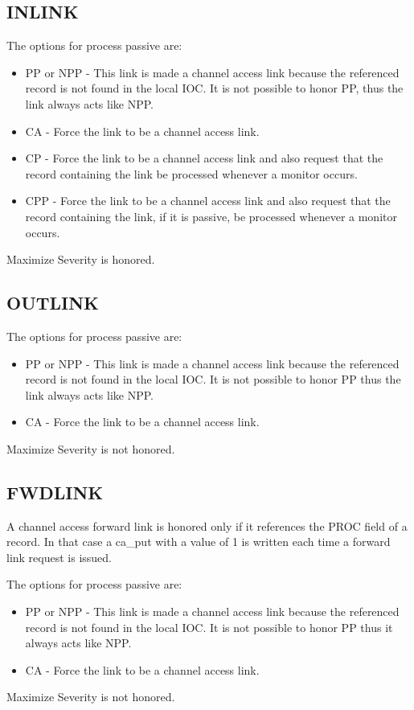 \subsection{INLINK}

The options for process passive are:

\begin{itemize}\item PP or NPP - This link is made a channel access link because the referenced record is not found in the local IOC. It 
is not possible to honor PP, thus the link always acts like NPP.

\item CA - Force the link to be a channel access link.

\item CP - Force the link to be a channel access link and also request that the record containing the link be processed 
whenever a monitor occurs.

\item CPP - Force the link to be a channel access link and also request that the record containing the link, if it is passive, 
be processed whenever a monitor occurs.

\end{itemize}Maximize Severity is honored.

\subsection{OUTLINK}

The options for process passive are:

\begin{itemize}\item PP or NPP - This link is made a channel access link because the referenced record is not found in the local IOC. It 
is not possible to honor PP thus the link always acts like NPP.

\item CA - Force the link to be a channel access link.

\end{itemize}Maximize Severity is not honored.

\subsection{FWDLINK}

A channel access forward link is honored only if it references the PROC field of a record. In that case a ca\_put with a 
value of 1 is written each time a forward link request is issued.

The options for process passive are:

\begin{itemize}\item PP or NPP - This link is made a channel access link because the referenced record is not found in the local IOC. It 
is not possible to honor PP thus it always acts like NPP.

\item CA - Force the link to be a channel access link.

\end{itemize}Maximize Severity is not honored.


